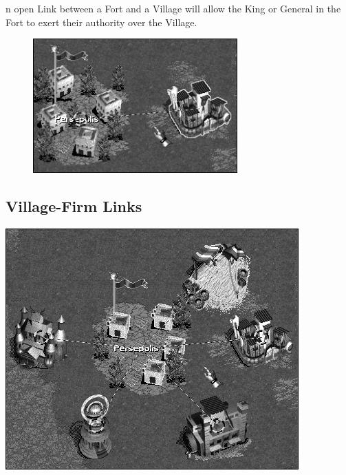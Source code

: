 n open Link between a Fort and a Village will allow the King or General in the Fort to exert their authority over the Village.


\begin{figure}
    \vspace{-20pt}
    \begin{center}
        \includegraphics[width=0.7\textwidth]{Iactivelink_fort}
    \end{center}
    \vspace{-50pt}
\end{figure}

\subsection{\textsf{Village-Firm Links}}


\begin{center}
    \includegraphics[width=1\linewidth]{Imultilinks} %
\end{center}

